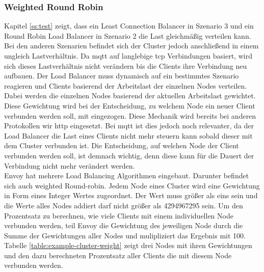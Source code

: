 \subsubsection{Weighted Round Robin}
Kapitel \ref{ss:test} zeigt, dass ein Least Connection Balancer in Szenario 3 und ein Round Robin Load Balancer in Szenario 2 die Last gleichmä{\ss}ig verteilen kann. Bei den anderen Szenarien befindet sich der Cluster jedoch anschlie{\ss}end in einem ungleich Lastverhältnis. Da \ac{mqtt} auf langlebige \ac{tcp} Verbindungen basiert, wird sich dieses Lastverhältnis nicht verändern bis die Clients ihre Verbindung neu aufbauen.
Der Load Balancer muss dynamisch auf ein bestimmtes Szenario reagieren und Clients basierend der Arbeitslast der einzelnen Nodes verteilen.
Dabei werden die einzelnen Nodes basierend der aktuellen Arbeitslast gewichtet. Diese Gewichtung wird bei der Entscheidung, zu welchem Node ein neuer Client verbunden werden soll, mit eingezogen.
Diese Mechanik wird bereits bei anderen Protokollen wir \ac{http} eingesetzt. Bei \ac{mqtt} ist dies jedoch noch relevanter, da der Load Balancer die Last eines Clients nicht mehr steuern kann sobald dieser mit dem Cluster verbunden ist. Die Entscheidung, auf welchen Node der Client verbunden werden soll, ist demnach wichtig, denn diese kann für die Dauert der Verbindung nicht mehr verändert werden.
\\
Envoy hat mehrere Load Balancing Algorithmen eingebaut. Darunter befindet sich auch weighted Round-robin. Jedem Node eines Cluster wird eine Gewichtung in Form eines Integer Wertes zugeordnet. Der Wert muss grö{\ss}er als eins sein und die Werte alles Nodes addiert darf nicht grö{\ss}er als 4294967295 sein.
Um den Prozentsatz zu berechnen, wie viele Clients mit einem individuellen Node verbunden werden, teil Envoy die Gewichtung des jeweiligen Node durch die Summe der Gewichtungen aller Nodes und mulipliziert das Ergebnis mit 100.
\cite{SupportedLoadBalancers}
\\
Tabelle \ref{table:example-cluster-weight} zeigt drei Nodes mit ihren Gewichtungen und den dazu berechneten Prozentsatz aller Clients die mit diesem Node verbunden werden.


